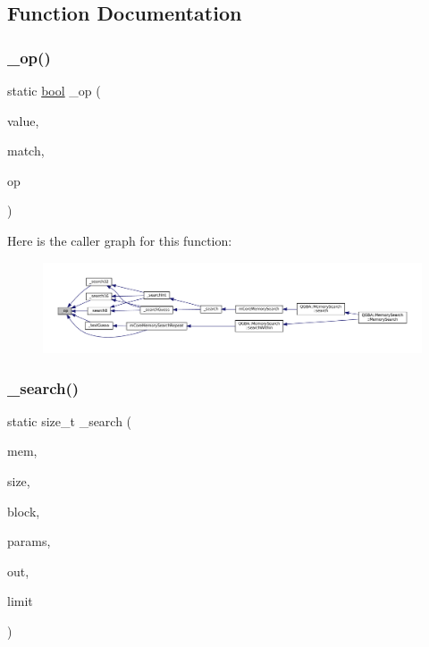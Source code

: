 \subsection{Function Documentation}
\mbox{\label{mem-search_8c_a0f60c5ade89ac84c9c4a44fcce11c5b3}} 
\subsubsection{\texorpdfstring{\+\_\+op()}{\_op()}}
{\footnotesize\ttfamily static \mbox{\hyperlink{libretro_8h_a4a26dcae73fb7e1528214a068aca317e}{bool}} \+\_\+op (\begin{DoxyParamCaption}\item[{int32\+\_\+t}]{value,  }\item[{int32\+\_\+t}]{match,  }\item[{enum m\+Core\+Memory\+Search\+Op}]{op }\end{DoxyParamCaption})\hspace{0.3cm}{\ttfamily [static]}}

Here is the caller graph for this function\+:
\nopagebreak
\begin{figure}[H]
\begin{center}
\leavevmode
\includegraphics[width=350pt]{mem-search_8c_a0f60c5ade89ac84c9c4a44fcce11c5b3_icgraph}
\end{center}
\end{figure}
\mbox{\label{mem-search_8c_add108d0650bfe6f0112626eb68ad814e}} 
\subsubsection{\texorpdfstring{\+\_\+search()}{\_search()}}
{\footnotesize\ttfamily static size\+\_\+t \+\_\+search (\begin{DoxyParamCaption}\item[{const void $\ast$}]{mem,  }\item[{size\+\_\+t}]{size,  }\item[{const struct m\+Core\+Memory\+Block $\ast$}]{block,  }\item[{const struct m\+Core\+Memory\+Search\+Params $\ast$}]{params,  }\item[{struct m\+Core\+Memory\+Search\+Results $\ast$}]{out,  }\item[{size\+\_\+t}]{limit }\end{DoxyParamCaption})\hspace{0.3cm}{\ttfamily [static]}}

